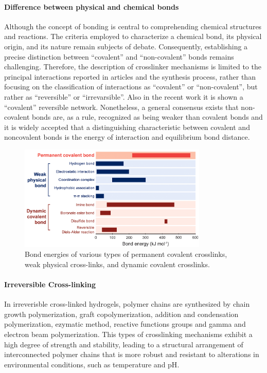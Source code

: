 \paragraph{Difference between physical and chemical bonds}
Although the concept of bonding is central to comprehending chemical structures and reactions.
The criteria employed to characterize a chemical bond, its physical origin, and its nature remain subjects of debate\citep{kumarDevelopingCriterionCharacterize2021}.
Consequently, establishing a precise distinction between ``covalent'' and ``non-covalent'' bonds remains challenging.
Therefore, the description of crosslinker mechanisms is limited to the principal interactions reported in articles and the synthesis process, rather than focusing on the classification of interactions as ``covalent'' or ``non-covalent'', but rather as ``reversible'' or ``irrevarsible''.
Also in the recent work \citep{picchioniHydrogelsBasedDynamic2018} it is shown a ``covalent'' reversible network. 
Nonetheless, a general consensus exists that non-covalent bonds are, as a rule, recognized as being weaker than covalent bonds and it is widely accepted that a distinguishing characteristic between covalent and noncovalent bonds is the energy of interaction and equilibrium bond distance\citep{kumarDevelopingCriterionCharacterize2021,novikovNonCovalentInteractionsPolymers2023}.

\begin{figure}[!ht]
    \centering
    \includegraphics[width=0.8\textwidth]{figs/bonds_energy.png}
    \caption{Bond energies of various types of permanent covalent crosslinks, weak physical cross-links, and dynamic covalent crosslinks.}
\end{figure}

\paragraph{Irreversible Cross-linking}
In irreverisble cross-linked hydrogels, polymer chains are synthesized by chain growth polymerization, graft copolymerization, addition and condensation polymerization, ezymatic method, reactive functions groups and gamma and electron beam polymerization\citep{maitraCrosslinkingHydrogelsReview2014,bustamantetorresHydrogelsClassificationAccording2021}.
This types of crosslinking mechanisms exhibit a high degree of strength and stability, leading to a structural arrangement of interconnected polymer chains that is more robust and resistant to alterations in environmental conditions, such as temperature and pH\citep{maitraCrosslinkingHydrogelsReview2014}.


